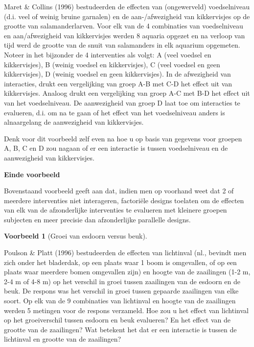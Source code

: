 \documentclass[
  12pt,dutch,coursenotes]{book}
\theoremstyle{definition}
\theoremstyle{definition}
\newtheorem{example}{Voorbeeld}[chapter]
\theoremstyle{definition}
\theoremstyle{remark}
\begin{document}
Maret \& Collins (1996) bestudeerden de effecten van (ongewerveld) voedselniveau (d.i. veel of weinig bruine garnalen) en de aan-/afwezigheid van kikkervisjes op de grootte van salamanderlarven. Voor elk van de 4 combinaties van voedselniveau en aan/afwezigheid van kikkervisjes werden 8 aquaria opgezet en na verloop van tijd werd de grootte van de snuit van salamanders in elk aquarium opgemeten. Noteer in het bijzonder de 4 interventies als volgt: A (veel voedsel en kikkervisjes), B (weinig voedsel en kikkervisjes), C (veel voedsel en geen kikkervisjes), D (weinig voedsel en geen kikkervisjes).
In de afwezigheid van interacties, drukt een vergelijking van groep A-B met C-D het effect uit
van kikkervisjes. Analoog drukt een vergelijking van groep A-C met B-D
het effect uit van het voedselniveau. De aanwezigheid van groep D laat toe om
interacties te evalueren, d.i. om na te gaan of het effect van het voedselniveau anders is alnaargelang de aanwezigheid van kikkervisjes.

Denk voor dit voorbeeld zelf even na hoe u op basis van gegevens voor
groepen A, B, C en D zou nagaan of er een interactie is tussen voedselniveau en
de aanwezigheid van kikkervisjes.

\textbf{Einde voorbeeld}

Bovenstaand voorbeeld geeft aan dat, indien men op voorhand weet dat 2 of meerdere interventies niet
interageren, factoriële designs toelaten om de effecten van elk van de
afzonderlijke interventies te evalueren met kleinere groepen subjecten en
meer precisie dan afzonderlijke parallelle designs.

\begin{example}[Groei van esdoorn versus beuk]
\protect\hypertarget{exm:unnamed-chunk-80}{}{\label{exm:unnamed-chunk-80} \iffalse (Groei van esdoorn versus beuk) \fi{} }
\end{example}

Poulson \& Platt (1996) bestudeerden de effecten van lichtinval (nl., bevindt men zich onder het bladerdak, op een plaats waar 1 boom is omgevallen, of op een plaats waar meerdere bomen omgevallen zijn) en hoogte van de zaailingen (1-2 m, 2-4 m of 4-8 m) op het verschil in groei tussen zaailingen van de esdoorn en de beuk. De respons was het verschil in groei tussen gepaarde zaailingen van elke soort. Op elk van de 9 combinaties van lichtinval en hoogte van de zaailingen werden 5 metingen voor de respons verzameld. Hoe zou
u het effect van lichtinval op het groeiverschil tussen esdoorn en beuk evalueren?
En het effect van de grootte van de zaailingen? Wat betekent het dat er een
interactie is tussen de lichtinval en grootte van de zaailingen?
\end{document}
